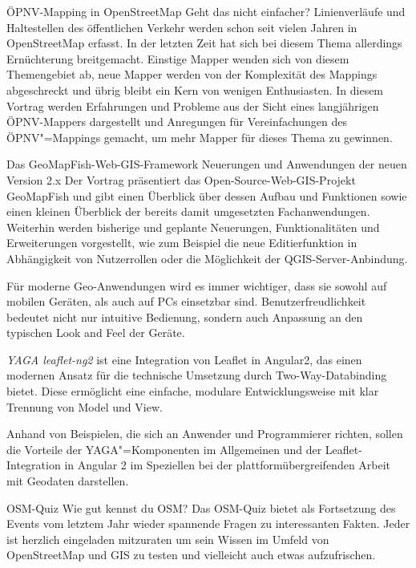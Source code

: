 %
{ÖPNV-Mapping in OpenStreetMap}%
{Geht das nicht einfacher?}%
{Linienverläufe und Haltestellen des öffentlichen Verkehr werden schon seit vielen Jahren in
OpenStreetMap erfasst. In der letzten Zeit hat sich bei diesem Thema allerdings Ernüchterung
breitgemacht. Einstige Mapper wenden sich von diesem Themengebiet ab, neue Mapper werden von der
Komplexität des Mappings abgeschreckt und übrig bleibt ein Kern von wenigen Enthusiasten.
In diesem
Vortrag werden Erfahrungen und Probleme aus der Sicht eines langjährigen ÖPNV-Mappers dargestellt
und Anregungen für Vereinfachungen des ÖPNV"=Mappings gemacht, um mehr Mapper für dieses Thema zu
gewinnen.}

%
{Das GeoMapFish-Web-GIS-Framework}%
{Neuerungen und Anwendungen der neuen Version 2.x}%
{Der Vortrag präsentiert das Open-Source-Web-GIS-Projekt GeoMapFish und gibt einen Überblick über
dessen Aufbau und Funktionen sowie einen kleinen Überblick der bereits damit umgesetzten
Fachanwendungen. Weiterhin werden bisherige und geplante Neuerungen, Funktionalitäten und
Erweiterungen vorgestellt, wie zum Beispiel die neue Editierfunktion in Abhängigkeit von
Nutzerrollen oder die Möglichkeit der QGIS-Server-Anbindung.}

%
{}%
{Für moderne Geo-Anwendungen wird es immer wichtiger, dass sie sowohl auf
mobilen Geräten, als auch auf PCs einsetzbar sind. Benutzerfreudlichkeit
bedeutet nicht nur intuitive Bedienung, sondern auch Anpassung an den typischen
Look and Feel der Geräte.

\emph{YAGA leaflet-ng2} ist eine Integration von Leaflet in Angular2, das einen
modernen Ansatz für die technische Umsetzung durch Two-Way-Databinding
bietet. Diese ermöglicht eine einfache, modulare Entwicklungsweise mit klar
Trennung von Model und View.

Anhand von Beispielen, die sich an Anwender und Programmierer richten, sollen
die Vorteile der YAGA"=Komponenten im Allgemeinen und der Leaflet-Integration in
Angular 2 im Speziellen bei der plattformübergreifenden Arbeit mit Geodaten
darstellen.
}

%
{OSM-Quiz}%
{Wie gut kennst du OSM?}%
{Das OSM-Quiz bietet als Fortsetzung des Events vom letztem Jahr wieder spannende Fragen zu
interessanten Fakten. Jeder ist herzlich eingeladen mitzuraten um sein Wissen im Umfeld von
OpenStreetMap und GIS zu testen und vielleicht auch etwas aufzufrischen.}

\vspace{-1\baselineskip}
